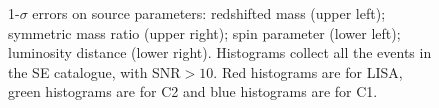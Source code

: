 \documentclass{iopart}
\begin{document}


\begin{figure}
\caption{1-$\sigma$ errors on source parameters: redshifted mass (upper left); symmetric mass ratio (upper right); spin parameter (lower left); luminosity distance (lower right). Histograms collect all the events in the SE catalogue, with SNR$>10$. Red histograms are for LISA, green histograms are for C2 and blue histograms are for C1.
\label{Hist_SE_LISAC1C2} } 
\end{figure}
\end{document}
